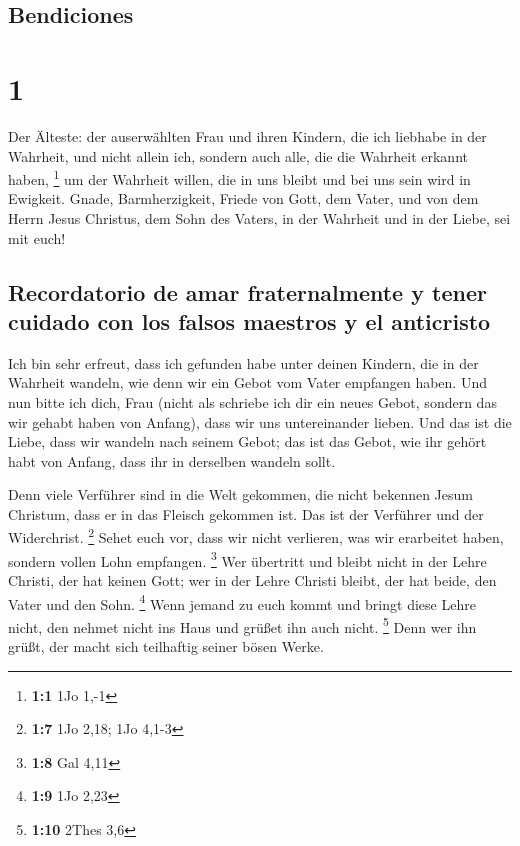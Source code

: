 \hypertarget{bendiciones}{%
\subsection{Bendiciones}\label{bendiciones}}

\hypertarget{section}{%
\section{1}\label{section}}

 Der Älteste: der auserwählten Frau und ihren Kindern, die
ich liebhabe in der Wahrheit, und nicht allein ich, sondern auch alle,
die die Wahrheit erkannt haben, \footnote{\textbf{1:1} 1Jo 1,-1}
 um der Wahrheit willen, die in uns bleibt und bei uns
sein wird in Ewigkeit.  Gnade, Barmherzigkeit, Friede von
Gott, dem Vater, und von dem Herrn Jesus Christus, dem Sohn des Vaters,
in der Wahrheit und in der Liebe, sei mit euch!

\hypertarget{recordatorio-de-amar-fraternalmente-y-tener-cuidado-con-los-falsos-maestros-y-el-anticristo}{%
\subsection{Recordatorio de amar fraternalmente y tener cuidado con los
falsos maestros y el
anticristo}\label{recordatorio-de-amar-fraternalmente-y-tener-cuidado-con-los-falsos-maestros-y-el-anticristo}}

 Ich bin sehr erfreut, dass ich gefunden habe unter deinen
Kindern, die in der Wahrheit wandeln, wie denn wir ein Gebot vom Vater
empfangen haben.  Und nun bitte ich dich, Frau (nicht als
schriebe ich dir ein neues Gebot, sondern das wir gehabt haben von
Anfang), dass wir uns untereinander lieben.  Und das ist
die Liebe, dass wir wandeln nach seinem Gebot; das ist das Gebot, wie
ihr gehört habt von Anfang, dass ihr in derselben wandeln sollt.

 Denn viele Verführer sind in die Welt gekommen, die nicht
bekennen Jesum Christum, dass er in das Fleisch gekommen ist. Das ist
der Verführer und der Widerchrist. \footnote{\textbf{1:7} 1Jo 2,18; 1Jo
  4,1-3}  Sehet euch vor, dass wir nicht verlieren, was
wir erarbeitet haben, sondern vollen Lohn empfangen. \footnote{\textbf{1:8}
  Gal 4,11}  Wer übertritt und bleibt nicht in der Lehre
Christi, der hat keinen Gott; wer in der Lehre Christi bleibt, der hat
beide, den Vater und den Sohn. \footnote{\textbf{1:9} 1Jo 2,23}
 Wenn jemand zu euch kommt und bringt diese Lehre nicht,
den nehmet nicht ins Haus und grüßet ihn auch nicht. \footnote{\textbf{1:10}
  2Thes 3,6}  Denn wer ihn grüßt, der macht sich
teilhaftig seiner bösen Werke.

